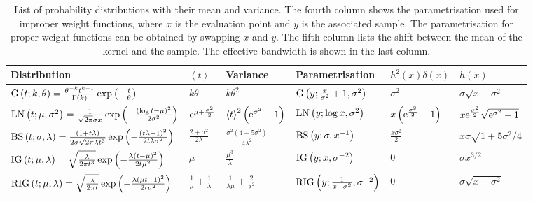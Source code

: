 \begin{table}
\textheight%
\begin{tabular*}{1\textheight}{@{\extracolsep{\fill}}llllll}
Distribution & $\left\langle t\right\rangle $ & Variance & Parametrisation & $h^{2}\left(x\right)\delta\left(x\right)$ & $h\left(x\right)$\tabularnewline
\hline 
$\mathrm{G}\left(t;k,\theta\right)=\frac{\theta^{-k}t^{k-1}}{\Gamma(k)}\exp\left(-\frac{t}{\theta}\right)$ & $k\theta$ & $k\theta^{2}$ & $\mathrm{G}\left(y;\frac{x}{\sigma^{2}}+1,\sigma^{2}\right)$ & $\sigma^{2}$ & $\sigma\sqrt{x+\sigma^{2}}$\tabularnewline
$\mathrm{LN}\left(t;\mu,\sigma^{2}\right)=\frac{1}{\sqrt{2\pi}\sigma x}\exp\left(-\frac{\left(\log t-\mu\right)^{2}}{2\sigma^{2}}\right)$ & $\mathrm{e}^{\mu+\frac{\sigma^{2}}{2}}$ & $\left\langle t\right\rangle ^{2}\left(\mathrm{e}^{\sigma^{2}}-1\right)$ & $\mathrm{LN}\left(y;\log x,\sigma^{2}\right)$ & $x\left(\mathrm{e}^{\frac{\sigma^{2}}{2}}-1\right)$ & $x\mathrm{e}^{\frac{\sigma^{2}}{2}}\sqrt{\mathrm{e}^{\sigma^{2}}-1}$\tabularnewline
$\mathrm{BS}\left(t;\sigma,\lambda\right)=\frac{(1+t\lambda)}{2\sigma\sqrt{2\pi\lambda t^{3}}}\exp\left(-\frac{(t\lambda-1)^{2}}{2t\lambda\sigma^{2}}\right)$ & $\frac{2+\sigma^{2}}{2\lambda}$ & $\frac{\sigma^{2}\left(4+5\sigma^{2}\right)}{4\lambda^{2}}$ & $\mathrm{BS}\left(y;\sigma,x^{-1}\right)$ & $\frac{x\sigma^{2}}{2}$ & $x\sigma\sqrt{1+5\sigma^{2}/4}$\tabularnewline
$\mathrm{IG}\left(t;\mu,\lambda\right)=\sqrt{\frac{\lambda}{2\pi t^{3}}}\exp\left(-\frac{\lambda(t-\mu)^{2}}{2t\mu^{2}}\right)$ & $\mu$ & $\frac{\mu^{3}}{\lambda}$ & $\mathrm{IG}\left(y;x,\sigma^{-2}\right)$ & 0 & $\sigma x^{3/2}$\tabularnewline
$\mathrm{RIG}\left(t;\mu,\lambda\right)=\sqrt{\frac{\lambda}{2\pi t}}\exp\left(-\frac{\lambda(\mu t-1)^{2}}{2t\mu^{2}}\right)$ & $\frac{1}{\mu}+\frac{1}{\lambda}$ & $\frac{1}{\lambda\mu}+\frac{2}{\lambda^{2}}$ & $\mathrm{RIG}\left(y;\frac{1}{x-\sigma^{2}},\sigma^{-2}\right)$ & 0 & $\sigma\sqrt{x+\sigma^{2}}$\tabularnewline
\end{tabular*}

\vspace{2em}
\caption{\label{tbl:kernels}List of probability distributions with their mean and variance. The fourth column shows the parametrisation used for improper weight functions, where $x$ is the evaluation point and $y$ is the associated sample. The parametrisation for proper weight functions can be obtained by swapping $x$ and $y$. The fifth column lists the shift between the mean of the kernel and the sample. The effective bandwidth is shown in the last column. }
\vspace{2em}



\end{table}
